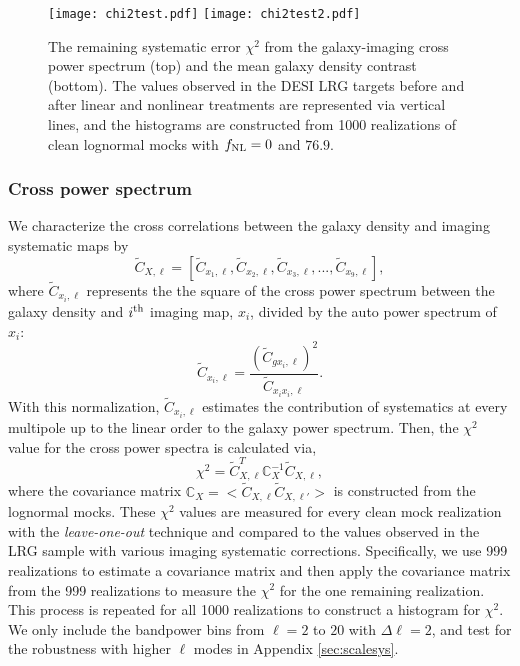 \begin{figure}
\centering
\texttt{[image: chi2test.pdf]}
\texttt{[image: chi2test2.pdf]}
\caption{The remaining systematic error $\chi^{2}$ from the galaxy-imaging cross power spectrum (top) and the mean galaxy density contrast (bottom). The values observed in the DESI LRG targets before and after linear and nonlinear treatments are represented via vertical lines, and the histograms are constructed from 1000 realizations of clean lognormal mocks with $f_{\rm NL}=0$ and $76.9$.}\label{fig:chi2test}
\end{figure}


\subsubsection{Cross power spectrum}

We characterize the cross correlations between the galaxy density and imaging systematic maps by
\begin{equation}
\tilde{C}_{X, \ell} = [\tilde{C}_{x_{1}, \ell}, \tilde{C}_{x_{2}, \ell}, \tilde{C}_{x_{3}, \ell}, ..., \tilde{C}_{x_{9}, \ell}],
\end{equation}
where $\tilde{C}_{x_{i}, \ell}$ represents the the square of the cross power spectrum between the galaxy density and $i^{\rm th}$ imaging map, $x_{i}$, divided by the auto power spectrum of $x_{i}$:
\begin{equation}\label{eq:cx}
\tilde{C}_{x_{i}, \ell} = \frac{(\tilde{C}_{gx_{i}, \ell})^{2}}{\tilde{C}_{x_{i}x_{i},\ell}}.
\end{equation}
With this normalization, $\tilde{C}_{x_{i}, \ell}$ estimates the contribution of systematics at every multipole up to the linear order to the galaxy power spectrum. Then, the $\chi^{2}$ value for the cross power spectra is calculated via,
\begin{equation}\label{eq:cx_chi2}
\chi^{2} = \tilde{C}^{T}_{X, \ell} \mathbb{C}_{X}^{-1} \tilde{C}_{X, \ell},
\end{equation}
where the covariance matrix $\mathbb{C}_{X} = < \tilde{C}_{X, \ell} \tilde{C}_{X, \ell'} >$ is constructed from the lognormal mocks. These $\chi^{2}$ values are measured for every clean mock realization with the \textit{leave-one-out} technique and compared to the values observed in the LRG sample with various imaging systematic corrections. Specifically, we use 999 realizations to estimate a covariance matrix and then apply the covariance matrix from the 999 realizations to measure the $\chi^{2}$ for the one remaining realization. This process is repeated for all 1000 realizations to construct a histogram for $\chi^{2}$. We only include the bandpower bins from $\ell=2$ to $20$ with $\Delta\ell=2$, and test for the robustness with higher $\ell$ modes in Appendix \ref{sec:scalesys}. 

